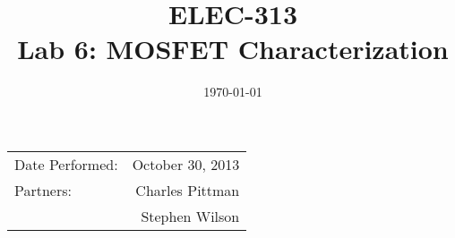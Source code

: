 \documentclass{article}
\author{}
\title{ELEC-313 \\ Lab 6: MOSFET Characterization\\ }
\date{\today}
\begin{document}
\maketitle

\begin{center}
  \begin{tabular}{lr}
    Date Performed: & October 30, 2013 \\
    Partners:       & Charles Pittman    \\
    & Stephen Wilson     \\
  \end{tabular}
\end{center}

\newpage


\end{document}
